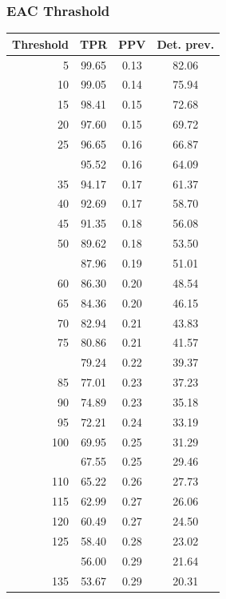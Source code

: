 \documentclass[12pt]{article}
\begin{document}
\subsubsection*{EAC Thrashold}

\begin{minipage}{0.5\textwidth}\small
\begin{tabular}{rccc}
\toprule
\textbf{Threshold} & \textbf{TPR} 
& \textbf{PPV} & \textbf{Det. prev.} \\
\midrule

      5 & 99.65 & 0.13 & 82.06 \\ 
     10 & 99.05 & 0.14 & 75.94 \\ 
     15 & 98.41 & 0.15 & 72.68 \\ 
     20 & 97.60 & 0.15 & 69.72 \\ 
     25 & 96.65 & 0.16 & 66.87 \\ \addlinespace
     30 & 95.52 & 0.16 & 64.09 \\ 
     35 & 94.17 & 0.17 & 61.37 \\ 
     40 & 92.69 & 0.17 & 58.70 \\ 
     45 & 91.35 & 0.18 & 56.08 \\ 
     50 & 89.62 & 0.18 & 53.50 \\  \addlinespace
     55 & 87.96 & 0.19 & 51.01 \\ 
     60 & 86.30 & 0.20 & 48.54 \\ 
     65 & 84.36 & 0.20 & 46.15 \\ 
     70 & 82.94 & 0.21 & 43.83 \\ 
     75 & 80.86 & 0.21 & 41.57 \\  \addlinespace
     80 & 79.24 & 0.22 & 39.37 \\ 
     85 & 77.01 & 0.23 & 37.23 \\ 
     90 & 74.89 & 0.23 & 35.18 \\ 
     95 & 72.21 & 0.24 & 33.19 \\ 
    100 & 69.95 & 0.25 & 31.29 \\  \addlinespace
    105 & 67.55 & 0.25 & 29.46 \\ 
    110 & 65.22 & 0.26 & 27.73 \\ 
    115 & 62.99 & 0.27 & 26.06 \\ 
    120 & 60.49 & 0.27 & 24.50 \\ 
    125 & 58.40 & 0.28 & 23.02 \\  \addlinespace
    130 & 56.00 & 0.29 & 21.64 \\ 
    135 & 53.67 & 0.29 & 20.31 \\ 

\end{tabular}
\end{minipage}
\end{document}
